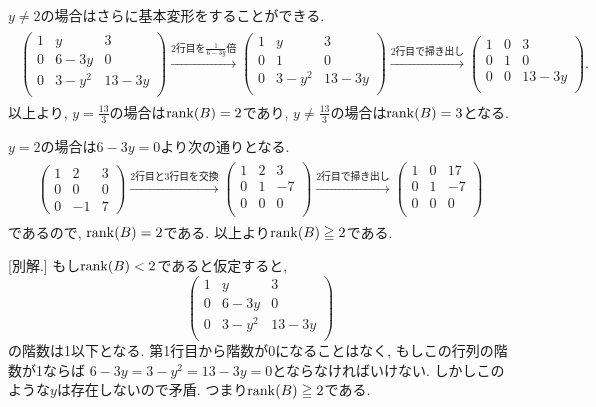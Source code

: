 \documentclass[dvipdfmx,a4paper,11pt]{article}
\theoremstyle{definition}
\begin{document}
$y \neq 2$の場合はさらに基本変形をすることができる.
\begin{align*}
\begin{split}
\begin{pmatrix}
1 &y&3 \\
0&6 - 3y &0 \\
0 & 3 - y^2& 13 - 3y\\
 \end{pmatrix} 
\overset{\text{2行目を$\frac{1}{6-3y}$倍}}{\longrightarrow} 
 \begin{pmatrix}
1 &y&3 \\
0&1  &0 \\
0 & 3 - y^2& 13 - 3y\\
 \end{pmatrix} 
  \overset{\text{2行目で掃き出し}}{\longrightarrow} 
 \begin{pmatrix}
1 &0&3 \\
0&1  &0 \\
0 & 0& 13 - 3y\\
 \end{pmatrix}.
 \end{split}
\end{align*}
以上より, $y = \frac{13}{3}$の場合は$\rank(B) = 2$であり, $y \neq \frac{13}{3}$の場合は$\rank(B) = 3$となる.

$y = 2$の場合は$6-3y =0$より次の通りとなる.
\begin{align*}
\begin{split}
\begin{pmatrix}
1 &2&3 \\
0&0&0 \\
0 & -1& 7 
 \end{pmatrix} 
  \overset{\text{2行目と3行目を交換}}{\longrightarrow} 
\begin{pmatrix}
1 &2&3 \\
0 & 1& -7 \\
0&0&0 \\
 \end{pmatrix}    
  \overset{\text{2行目で掃き出し}}{\longrightarrow} 
\begin{pmatrix}
1 &0&17 \\
0 & 1& -7 \\
0&0&0 \\
 \end{pmatrix} 
  \end{split}
\end{align*}
であるので, $\rank(B) = 2$である.
以上より$\rank(B) \geqq  2$である.

[別解.] もし$\rank(B) <  2$であると仮定すると, 
$$
 \begin{pmatrix}
1 &y&3 \\
0&6 - 3y &0 \\
0 & 3 - y^2& 13 - 3y\\
 \end{pmatrix}
 $$
 の階数は1以下となる. 第1行目から階数が0になることはなく, もしこの行列の階数が1ならば
 $6 - 3y  = 3 - y^2=13 - 3y =0$とならなければいけない.
 しかしこのような$y$は存在しないので矛盾. つまり$\rank(B) \geqq  2$である.
\end{document}
